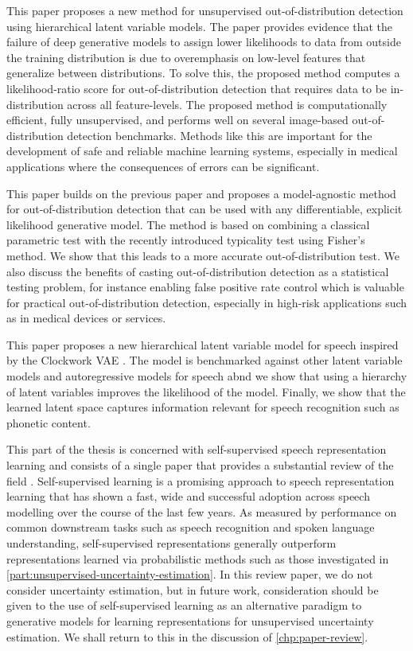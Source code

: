 This paper proposes a new method for unsupervised out-of-distribution detection using hierarchical latent variable models. The paper provides evidence that the failure of deep generative models to assign lower likelihoods to data from outside the training distribution is due to overemphasis on low-level features that generalize between distributions. To solve this, the proposed method computes a likelihood-ratio score for out-of-distribution detection that requires data to be in-distribution across all feature-levels. The proposed method is computationally efficient, fully unsupervised, and performs well on several image-based out-of-distribution detection benchmarks.
Methods like this are important for the development of safe and reliable machine learning systems, especially in medical applications where the consequences of errors can be significant. 


This paper builds on the previous paper and proposes a model-agnostic method for out-of-distribution detection that can be used with any differentiable, explicit likelihood generative model. The method is based on combining a classical parametric test with the recently introduced typicality test using Fisher's method. We show that this leads to a more accurate out-of-distribution test. We also discuss the benefits of casting out-of-distribution detection as a statistical testing problem, for instance enabling false positive rate control which is valuable for practical out-of-distribution detection, especially in high-risk applications such as in medical devices or services.


This paper proposes a new hierarchical latent variable model for speech inspired by the Clockwork VAE \cite{saxena_clockwork_2021}. The model is benchmarked against other latent variable models and autoregressive models for speech abnd we show that using a hierarchy of latent variables improves the likelihood of the model. Finally, we show that the learned latent space captures information relevant for speech recognition such as phonetic content.


This part of the thesis is concerned with self-supervised speech representation learning and consists of a single paper that provides a substantial review of the field \cite{mohamed_selfsupervised_2022}. 
Self-supervised learning is a promising approach to speech representation learning that has shown a fast, wide and successful adoption across speech modelling over the course of the last few years. 
As measured by performance on common downstream tasks such as speech recognition and spoken language understanding, self-supervised representations generally outperform representations learned via probabilistic methods such as those investigated in \cref{part:unsupervised-uncertainty-estimation}. 
In this review paper, we do not consider uncertainty estimation, but in future work, consideration should be given to the use of self-supervised learning as an alternative paradigm to generative models for learning representations for unsupervised uncertainty estimation. We shall return to this in the discussion of \cref{chp:paper-review}.

